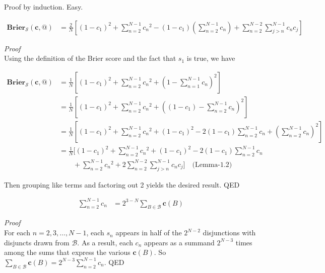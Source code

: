 \documentclass[
  10pt,
  letterpaper,
  DIV=11,
  numbers=noendperiod,
  twoside]{scrartcl}
\providecommand{\tightlist}{%
  \setlength{\itemsep}{0pt}\setlength{\parskip}{0pt}}\usepackage{longtable,booktabs,array}
\begin{document}
Proof by induction. Easy.

\begin{description}
\tightlist
\item[Lemma-1.3]
\[
  \begin{aligned}
   \mathbf{Brier}_{\mathscr{S}}(\mathbf{c},@) &= \frac{2}{N}[(1-c_1)^2 + \sum_{n=2}^{N-1} c{_n}^2  - (1-c_1)(\sum_{n=2}^{N-1}c_n) + \sum_{n=2}^{N-2} \sum_{j>n}^{N-1}c_nc_j]
   \end{aligned}
   \]
\end{description}

\emph{Proof}\\
Using the definition of the Brier score and the fact that \(s_1\) is
true, we have

\[
\begin{aligned}
\mathbf{Brier}_{\mathscr{S}}(\mathbf{c},@) &= \frac{1}{N}[(1 - c_1)^2 + \sum_{n=2}^{N-1} c{_n}^2 + (1 - \sum_{n=1}^{N-1}c_n)^2] \\
&= \frac{1}{N}[(1 - c_1)^2 + \sum_{n=2}^{N-1} c{_n}^2 + ((1 -c_1) - \sum_{n=2}^{N-1}c_n)^2] \\
&= \frac{1}{N}[(1 - c_1)^2 + \sum_{n=2}^{N-1} c{_n}^2 + (1 -c_1)^2 - 2(1 - c_1) \sum_{n=2}^{N-1}c_n + (\sum_{n=2}^{N-1}c_n)^2] \\
&= \frac{1}{N}[(1 - c_1)^2 + \sum_{n=2}^{N-1} c{_n}^2 + (1 -c_1)^2 - 2(1 - c_1) \sum_{n=2}^{N-1}c_n  \\
&\quad \quad +\sum_{n=2}^{N-1} c{_n}^2 + 2 \sum_{n=2}^{N-2} \sum_{j>n}^{N-1}c_nc_j] \quad \text{(Lemma-1.2)}
\end{aligned}
\]

Then grouping like terms and factoring out 2 yields the desired result.
QED

\begin{description}
\tightlist
\item[Lemma-1.4]
\[
 \begin{aligned}
 \sum_{n=2}^{N-1}c_n &= 2^{3-N}\sum_{B \in \mathscr{B}}\mathbf{c}(B)
 \end{aligned}
 \]
\end{description}

\emph{Proof}\\
For each \(n = 2, 3, \dots, N-1\), each \(s_n\) appears in half of the
\(2^{N-2}\) disjunctions with disjuncts drawn from \(\mathscr{B}\). As a
result, each \(c_n\) appears as a summand \(2^{N-3}\) times among the
sums that express the various \(\mathbf{c}(B)\). So
\(\sum_{B \in \mathscr{B}}\mathbf{c}(B) = 2^{N-3}\sum_{n=2}^{N-1}c_n\).
QED
\end{document}
